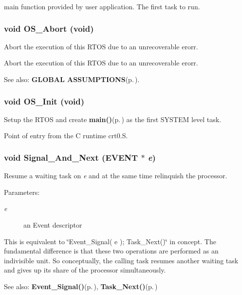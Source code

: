 main function provided by user application. The first task to run. 

\subsubsection{\setlength{\rightskip}{0pt plus 5cm}void OS\_\-Abort (void)}\label{os_8c_b5747390a8be675282cb93e5198bd085}


Abort the execution of this RTOS due to an unrecoverable erorr. 

Abort the execution of this RTOS due to an unrecoverable erorr. \begin{Desc}
\item[See also:]{\bf GLOBAL ASSUMPTIONS}{\rm (p.\,\pageref{index_assumptions})}. \end{Desc}
\subsubsection{\setlength{\rightskip}{0pt plus 5cm}void OS\_\-Init (void)}\label{os_8c_280149a9407c6504ce0af541351561db}


Setup the RTOS and create {\bf main()}{\rm (p.\,\pageref{_assignment2_8c_840291bc02cba5474a4cb46a9b9566fe})} as the first SYSTEM level task. 

Point of entry from the C runtime crt0.S. 
\subsubsection{\setlength{\rightskip}{0pt plus 5cm}void Signal\_\-And\_\-Next ({\bf EVENT} $\ast$ {\em e})}\label{os_8c_899044f5840427560c88d0d6e8944629}


Resume a waiting task on {\em e\/} and at the same time relinquish the processor. 

\begin{Desc}
\item[Parameters:]
\begin{description}
\item[{\em e}]an Event descriptor\end{description}
\end{Desc}
This is equivalent to \char`\"{}Event\_\-Signal( e ); Task\_\-Next()\char`\"{} in concept. The fundamental difference is that these two operations are performed as an indivisible unit. So conceptually, the calling task resumes another waiting task and gives up its share of the processor simultaneously. \begin{Desc}
\item[See also:]{\bf Event\_\-Signal()}{\rm (p.\,\pageref{os_8c_39210e081be158dab105c68cb85585cd})}, {\bf Task\_\-Next()}{\rm (p.\,\pageref{os_8c_5a9b72d0dadaea32fec8d4ff1c0eafa4})} \end{Desc}
